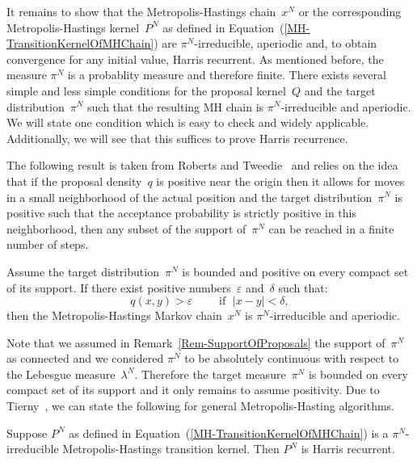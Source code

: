 It remains to show that the Metropolis-Hastings chain~$x^N$ or the corresponding Metropolis-Hastings kernel~$P^{N}$ as defined in Equation~(\ref{MH-TransitionKernelOfMHChain}) are $\pi^{N}$-irreducible, aperiodic and, to obtain convergence for any initial value, Harris recurrent. As mentioned before, the measure $\pi^{N}$ is a probablity measure and therefore finite. There exists several simple and less simple conditions for the proposal kernel~$Q$ and the target distribution~$\pi^{N}$ such that the resulting MH chain is $\pi^{N}$-irreducible and aperiodic. We will state one condition which is easy to check and widely applicable. Additionally, we will see that this suffices to prove Harris recurrence.

The following result is taken from Roberts and Tweedie~\autocite{RobertsTweedie1996} and relies on the idea that if the proposal density~$q$ is positive near the origin then it allows for moves in a small neighborhood of the actual position and the target distribution~$\pi^{N}$ is positive such that the acceptance probability is strictly positive in this neighborhood, then any subset of the support of~$\pi^{N}$ can be reached in a finite number of steps.

\begin{lemma}\autocite{RobertsTweedie1996}
\label{lemma - Assumptions on Q}
  Assume the target distribution~$\pi^{N}$ is bounded and positive on every compact set of its support. If there exist positive numbers~$\varepsilon$ and~$\delta$ such that:
  \begin{equation}
   \label{MH - Conditions for irrducibility}
   q(x, y) > \varepsilon \qquad \text{ if } \; |x-y| < \delta,
  \end{equation}
  then the Metropolis-Hastings Markov chain~$x^{N}$ is $\pi^{N}$-irreducible and aperiodic.

\end{lemma}

Note that we assumed in Remark~\ref{Rem-SupportOfProposals} the support of~$\pi^{N}$ as connected and we considered $\pi^N$ to be absolutely continuous with respect to the Lebesgue measure~$\lambda^N$. Therefore the target measure~$\pi^N$ is bounded on every compact set of its support and it only remains to assume positivity. Due to Tierny~\autocite{Tierny1994}, we can state the following for general Metropolis-Hasting algorithms.

\begin{lemma}\autocite[Corollary 2]{Tierny1994}
\label{Lemma - Harris reccurence}
 \label{MH - Harris recurrence for MH algorithms}
 Suppose $P^{N}$ as defined in Equation~(\ref{MH-TransitionKernelOfMHChain}) is a $\pi^N$-irreducible Metropolis-Hastings transition kernel. Then $P^{N}$ is Harris recurrent.
\end{lemma}

